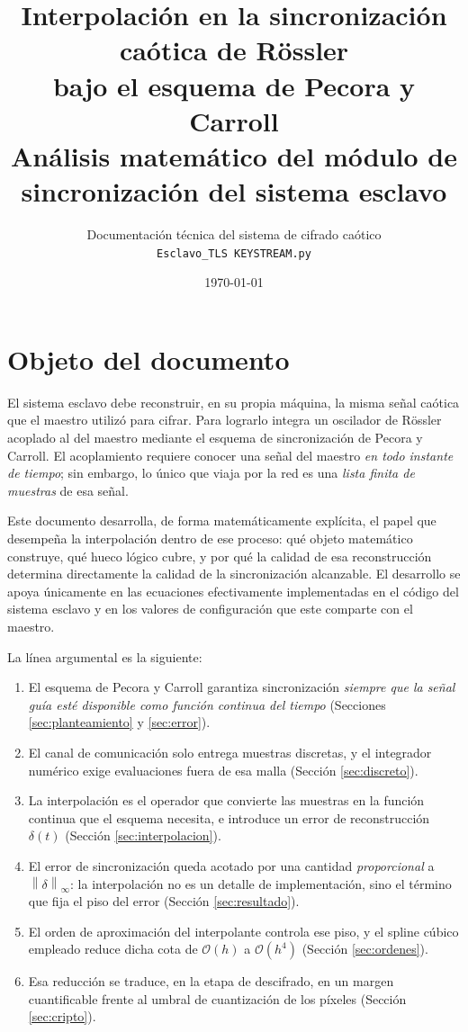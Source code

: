 \documentclass[12pt,a4paper]{article}
\title{Interpolación en la sincronización caótica de Rössler\\
       bajo el esquema de Pecora y Carroll\\[0.35em]
       \large Análisis matemático del módulo de sincronización del sistema esclavo}
\author{Documentación técnica del sistema de cifrado caótico\\
        \texttt{Esclavo\_TLS KEYSTREAM.py}}
\date{\today}
\newcommand{\dnorm}[1]{\left\lVert #1 \right\rVert}
\newcommand{\infnorm}[1]{\dnorm{#1}_{\infty}}
\begin{document}
\maketitle
\tableofcontents
\newpage

\section{Objeto del documento}

El sistema esclavo debe reconstruir, en su propia máquina, la misma señal caótica
que el maestro utilizó para cifrar. Para lograrlo integra un oscilador de Rössler
acoplado al del maestro mediante el esquema de sincronización de Pecora y Carroll.
El acoplamiento requiere conocer una señal del maestro \emph{en todo instante de
tiempo}; sin embargo, lo único que viaja por la red es una \emph{lista finita de
muestras} de esa señal.

Este documento desarrolla, de forma matemáticamente explícita, el papel que
desempeña la interpolación dentro de ese proceso: qué objeto matemático construye,
qué hueco lógico cubre, y por qué la calidad de esa reconstrucción determina
directamente la calidad de la sincronización alcanzable. El desarrollo se apoya
únicamente en las ecuaciones efectivamente implementadas en el código del sistema
esclavo y en los valores de configuración que este comparte con el maestro.

La línea argumental es la siguiente:

\begin{enumerate}
  \item El esquema de Pecora y Carroll garantiza sincronización \emph{siempre que
        la señal guía esté disponible como función continua del tiempo}
        (Secciones \ref{sec:planteamiento} y \ref{sec:error}).
  \item El canal de comunicación solo entrega muestras discretas, y el integrador
        numérico exige evaluaciones fuera de esa malla
        (Sección \ref{sec:discreto}).
  \item La interpolación es el operador que convierte las muestras en la función
        continua que el esquema necesita, e introduce un error de reconstrucción
        $\delta(t)$ (Sección \ref{sec:interpolacion}).
  \item El error de sincronización queda acotado por una cantidad
        \emph{proporcional} a $\infnorm{\delta}$: la interpolación no es un detalle
        de implementación, sino el término que fija el piso del error
        (Sección \ref{sec:resultado}).
  \item El orden de aproximación del interpolante controla ese piso, y el spline
        cúbico empleado reduce dicha cota de $\mathcal{O}(h)$ a $\mathcal{O}(h^4)$
        (Sección \ref{sec:ordenes}).
  \item Esa reducción se traduce, en la etapa de descifrado, en un margen
        cuantificable frente al umbral de cuantización de los píxeles
        (Sección \ref{sec:cripto}).
\end{enumerate}
\end{document}

